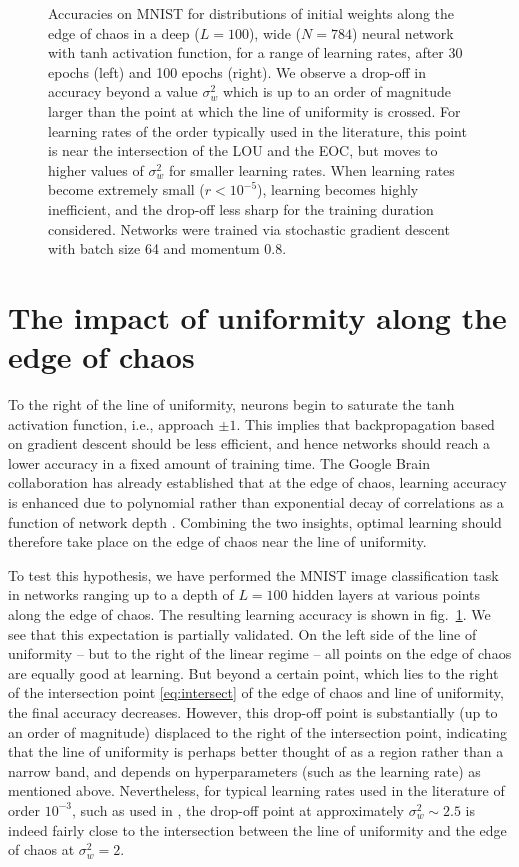 \begin{figure}[t!]
\begin{subfigure}[t]{0.5\textwidth}
	\end{subfigure}
	\caption{Accuracies on MNIST for distributions of initial weights along the edge of chaos in a deep ($L=100$), wide ($N=784$) neural network with tanh activation function, for a range of learning rates, after 30 epochs (left) and 100 epochs (right). We observe a drop-off in accuracy beyond a value $\sigma_w^2$ which is up to an order of magnitude larger than the point at which the line of uniformity is crossed. For learning rates of the order typically used in the literature, this point is near the intersection of the LOU and the EOC, but moves to higher values of $\sigma_w^2$ for smaller learning rates. When learning rates become extremely small ($r<10^{-5}$), learning becomes highly inefficient, and the drop-off less sharp for the training duration considered. Networks were trained via stochastic gradient descent with batch size 64 and momentum 0.8.} %
	\label{fig:edge of chaos-drop-off-beyond-lou}
\end{figure}

\section{The impact of uniformity along the edge of chaos}
To the right of the line of uniformity, neurons begin to saturate the tanh activation function, i.e., approach $\pm1$. This implies that backpropagation based on gradient descent should be less efficient, and hence networks should reach a lower accuracy in a fixed amount of training time. The Google Brain collaboration has already established that at the edge of chaos, learning accuracy is enhanced due to polynomial rather than exponential decay of correlations as a function of network depth \cite{2016arXiv161101232S}. Combining the two insights, optimal learning should therefore take place on the edge of chaos near the line of uniformity. 

To test this hypothesis, we have performed the MNIST image classification task in networks ranging up to a depth of $L=100$ hidden layers at various points along the edge of chaos. The resulting learning accuracy is shown in fig.~\ref{fig:edge of chaos-drop-off-beyond-lou}. We see that this expectation is partially validated. On the left side of the line of uniformity -- but to the right of the linear regime -- all points on the edge of chaos are equally good at learning. But beyond a certain point, which lies to the right of the intersection point \eqref{eq:intersect} of the edge of chaos and line of uniformity, the final accuracy decreases. However, this drop-off point is substantially (up to an order of magnitude) displaced to the right of the intersection point, indicating that the line of uniformity is perhaps better thought of as a region rather than a narrow band, and depends on hyperparameters (such as the learning rate) as mentioned above. Nevertheless, for typical learning rates used in the literature of order $10^{-3}$, such as used in \cite{2016arXiv161101232S}, the drop-off point at approximately $\sigma_{w}^{2} \sim 2.5$ is indeed fairly close to the intersection between the line of uniformity and the edge of chaos at $\sigma_{w}^{2} = 2$. 

